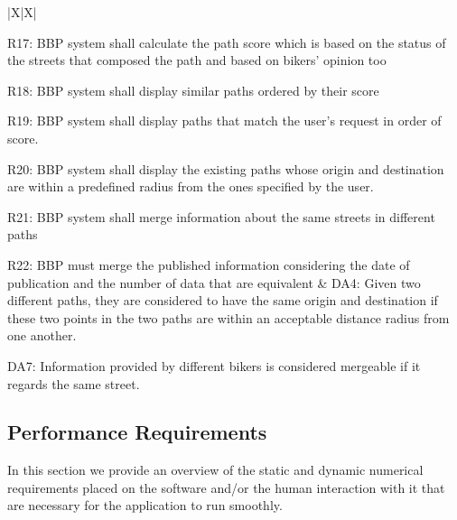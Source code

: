 \documentclass{article}
\begin{document}
\newpage
\begin{xltabular}{\textwidth}{|X|X|}
    \hline
     \\
    \hline
 
    R17: BBP system shall calculate the path score which is based on the status of the streets that composed the path and based on bikers’ opinion too \par
    R18: BBP system shall display similar paths ordered by their score \par
    R19: BBP system shall display paths that match the user's request in order of score. \par
    R20: BBP system shall display the existing paths whose origin and destination are within a predefined radius from the ones specified by the user. \par
    R21: BBP system shall merge information about the same streets in different paths \par
    R22: BBP must merge the published information considering the date of publication and the number of data that are equivalent
    & 
    DA4: Given two different paths, they are considered to have the same origin and destination if these two points in the two paths are within an acceptable distance radius from one another.   \par
    DA7: Information provided by different bikers is considered mergeable if it regards the same street. \\
    \hline

\end{xltabular}

\newpage
\subsection{Performance Requirements}
In this section we provide an overview of the static and dynamic numerical requirements placed on the software and/or the human interaction with it that are necessary for the application to run smoothly.
\end{document}
